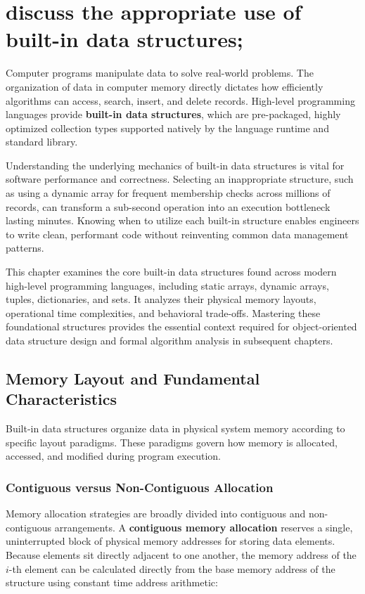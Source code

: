\documentclass[12pt]{report}
\begin{document}
\pagestyle{plain}
\setcounter{page}{3}
\setcounter{chapter}{0}
\chapter{discuss the appropriate use of built-in data structures;}

Computer programs manipulate data to solve real-world problems. The organization of data in computer memory directly dictates how efficiently algorithms can access, search, insert, and delete records. High-level programming languages provide \textbf{built-in data structures}, which are pre-packaged, highly optimized collection types supported natively by the language runtime and standard library.

Understanding the underlying mechanics of built-in data structures is vital for software performance and correctness. Selecting an inappropriate structure, such as using a dynamic array for frequent membership checks across millions of records, can transform a sub-second operation into an execution bottleneck lasting minutes. Knowing when to utilize each built-in structure enables engineers to write clean, performant code without reinventing common data management patterns.

This chapter examines the core built-in data structures found across modern high-level programming languages, including static arrays, dynamic arrays, tuples, dictionaries, and sets. It analyzes their physical memory layouts, operational time complexities, and behavioral trade-offs. Mastering these foundational structures provides the essential context required for object-oriented data structure design and formal algorithm analysis in subsequent chapters.

\section{Memory Layout and Fundamental Characteristics}

Built-in data structures organize data in physical system memory according to specific layout paradigms. These paradigms govern how memory is allocated, accessed, and modified during program execution.

\subsection{Contiguous versus Non-Contiguous Allocation}

Memory allocation strategies are broadly divided into contiguous and non-contiguous arrangements. A \textbf{contiguous memory allocation} reserves a single, uninterrupted block of physical memory addresses for storing data elements. Because elements sit directly adjacent to one another, the memory address of the $i$-th element can be calculated directly from the base memory address of the structure using constant time address arithmetic:
\end{document}
